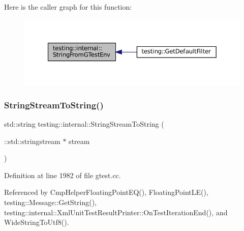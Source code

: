 Here is the caller graph for this function\+:
\nopagebreak
\begin{figure}[H]
\begin{center}
\leavevmode
\includegraphics[width=350pt]{namespacetesting_1_1internal_ac54dabc540bf79c2de91add679bfb93b_icgraph}
\end{center}
\end{figure}
\mbox{\label{namespacetesting_1_1internal_ac0a2b7f69fc829d80a39e925b6417e39}} 
\subsubsection{\texorpdfstring{String\+Stream\+To\+String()}{StringStreamToString()}}
{\footnotesize\ttfamily std\+::string testing\+::internal\+::\+String\+Stream\+To\+String (\begin{DoxyParamCaption}\item[{\+::std\+::stringstream $\ast$}]{stream }\end{DoxyParamCaption})}



Definition at line 1982 of file gtest.\+cc.



Referenced by Cmp\+Helper\+Floating\+Point\+E\+Q(), Floating\+Point\+L\+E(), testing\+::\+Message\+::\+Get\+String(), testing\+::internal\+::\+Xml\+Unit\+Test\+Result\+Printer\+::\+On\+Test\+Iteration\+End(), and Wide\+String\+To\+Utf8().



